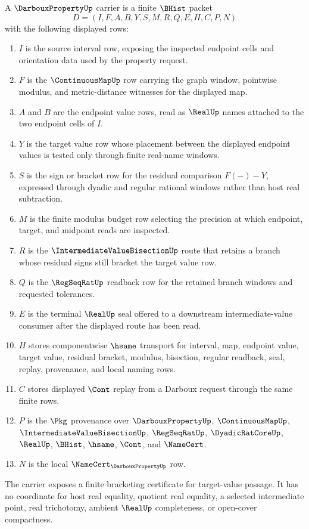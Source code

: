\begin{definition}
\label{def:darboux-property-carrier}
A $\DarbouxPropertyUp$ carrier is a finite $\BHist$ packet
$$
D=(I,F,A,B,Y,S,M,R,Q,E,H,C,P,N)
$$
with the following displayed rows:
\begin{enumerate}
\item $I$ is the source interval row, exposing the inspected endpoint cells and orientation data used by the property request.
\item $F$ is the $\ContinuousMapUp$ row carrying the graph window, pointwise modulus, and metric-distance witnesses for the displayed map.
\item $A$ and $B$ are the endpoint value rows, read as $\RealUp$ names attached to the two endpoint cells of $I$.
\item $Y$ is the target value row whose placement between the displayed endpoint values is tested only through finite real-name windows.
\item $S$ is the sign or bracket row for the residual comparison $F(-)-Y$, expressed through dyadic and regular rational windows rather than host real subtraction.
\item $M$ is the finite modulus budget row selecting the precision at which endpoint, target, and midpoint reads are inspected.
\item $R$ is the $\IntermediateValueBisectionUp$ route that retains a branch whose residual signs still bracket the target value row.
\item $Q$ is the $\RegSeqRatUp$ readback row for the retained branch windows and requested tolerances.
\item $E$ is the terminal $\RealUp$ seal offered to a downstream intermediate-value consumer after the displayed route has been read.
\item $H$ stores componentwise $\hsame$ transport for interval, map, endpoint value, target value, residual bracket, modulus, bisection, regular readback, seal, replay, provenance, and local naming rows.
\item $C$ stores displayed $\Cont$ replay from a Darboux request through the same finite rows.
\item $P$ is the $\Pkg$ provenance over $\DarbouxPropertyUp$, $\ContinuousMapUp$, $\IntermediateValueBisectionUp$, $\RegSeqRatUp$, $\DyadicRatCoreUp$, $\RealUp$, $\BHist$, $\hsame$, $\Cont$, and $\NameCert$.
\item $N$ is the local $\NameCert_{\DarbouxPropertyUp}$ row.
\end{enumerate}
The carrier exposes a finite bracketing certificate for target-value passage. It has no coordinate for host real equality, quotient real equality, a selected intermediate point, real trichotomy, ambient $\RealUp$ completeness, or open-cover compactness.
\end{definition}

